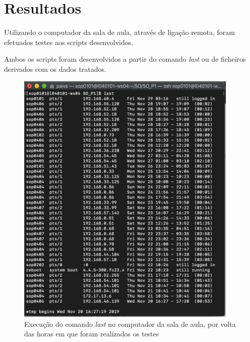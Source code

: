 \documentclass[10pt,portuguese]{article}
\begin{document}
\section{Resultados}
\par Utilizando o computador da sala de aula, através de ligação remota, foram efetuados testes aos scripts desenvolvidos.
\par Ambos os scripts foram desenvolvidos a partir do comando \textit{last} ou de ficheiros derivados com os dados tratados.
\begin{figure}[!h]
    \centering
    \includegraphics[width=400]{Resultados/last.png}
    \caption{Execução do comando \textit{last} no computador da sala de aula, por volta das horas em que foram realizados os testes}
\end{figure}
\clearpage
\end{document}
